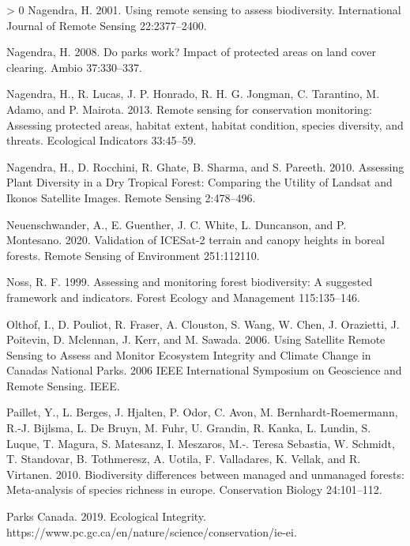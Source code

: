 \documentclass[10pt,oneside]{article}
\newlength{\cslhangindent}
\newenvironment{CSLReferences}[3] %
 {%
  \setlength{\parindent}{0pt}
  \ifodd #1 \everypar{\setlength{\hangindent}{\cslhangindent}}\ignorespaces\fi
  \ifnum #2 > 0
  \setlength{\parskip}{#2\baselineskip}
  \fi
 }%
 {}
\begin{document}
\begin{CSLReferences}{1}{0}
\leavevmode\hypertarget{ref-nagendra2001}{}%
Nagendra, H. 2001. Using remote sensing to assess biodiversity.
International Journal of Remote Sensing 22:2377--2400.

\leavevmode\hypertarget{ref-nagendraParksWorkImpact2008}{}%
Nagendra, H. 2008. Do parks work? Impact of protected areas on land
cover clearing. Ambio 37:330--337.

\leavevmode\hypertarget{ref-nagendraRemoteSensingConservation2013}{}%
Nagendra, H., R. Lucas, J. P. Honrado, R. H. G. Jongman, C. Tarantino,
M. Adamo, and P. Mairota. 2013. Remote sensing for conservation
monitoring: Assessing protected areas, habitat extent, habitat
condition, species diversity, and threats. Ecological Indicators
33:45--59.

\leavevmode\hypertarget{ref-nagendra2010}{}%
Nagendra, H., D. Rocchini, R. Ghate, B. Sharma, and S. Pareeth. 2010.
Assessing Plant Diversity in a Dry Tropical Forest: Comparing the
Utility of Landsat and Ikonos Satellite Images. Remote Sensing
2:478--496.

\leavevmode\hypertarget{ref-neuenschwander2020}{}%
Neuenschwander, A., E. Guenther, J. C. White, L. Duncanson, and P.
Montesano. 2020. Validation of ICESat-2 terrain and canopy heights in
boreal forests. Remote Sensing of Environment 251:112110.

\leavevmode\hypertarget{ref-noss1999}{}%
Noss, R. F. 1999. Assessing and monitoring forest biodiversity: A
suggested framework and indicators. Forest Ecology and Management
115:135--146.

\leavevmode\hypertarget{ref-olthofUsingSatelliteRemote2006}{}%
Olthof, I., D. Pouliot, R. Fraser, A. Clouston, S. Wang, W. Chen, J.
Orazietti, J. Poitevin, D. Mclennan, J. Kerr, and M. Sawada. 2006. Using
Satellite Remote Sensing to Assess and Monitor Ecosystem Integrity and
Climate Change in Canadas National Parks. 2006 IEEE International
Symposium on Geoscience and Remote Sensing. IEEE.

\leavevmode\hypertarget{ref-paillet2010}{}%
Paillet, Y., L. Berges, J. Hjalten, P. Odor, C. Avon, M.
Bernhardt-Roemermann, R.-J. Bijlsma, L. De Bruyn, M. Fuhr, U. Grandin,
R. Kanka, L. Lundin, S. Luque, T. Magura, S. Matesanz, I. Meszaros, M.-.
Teresa Sebastia, W. Schmidt, T. Standovar, B. Tothmeresz, A. Uotila, F.
Valladares, K. Vellak, and R. Virtanen. 2010. Biodiversity differences
between managed and unmanaged forests: Meta-analysis of species richness
in europe. Conservation Biology 24:101--112.

\leavevmode\hypertarget{ref-parkscanadaEcologicalIntegrity2019}{}%
Parks Canada. 2019. Ecological Integrity.
https://www.pc.gc.ca/en/nature/science/conservation/ie-ei.


\end{CSLReferences}
\end{document}
